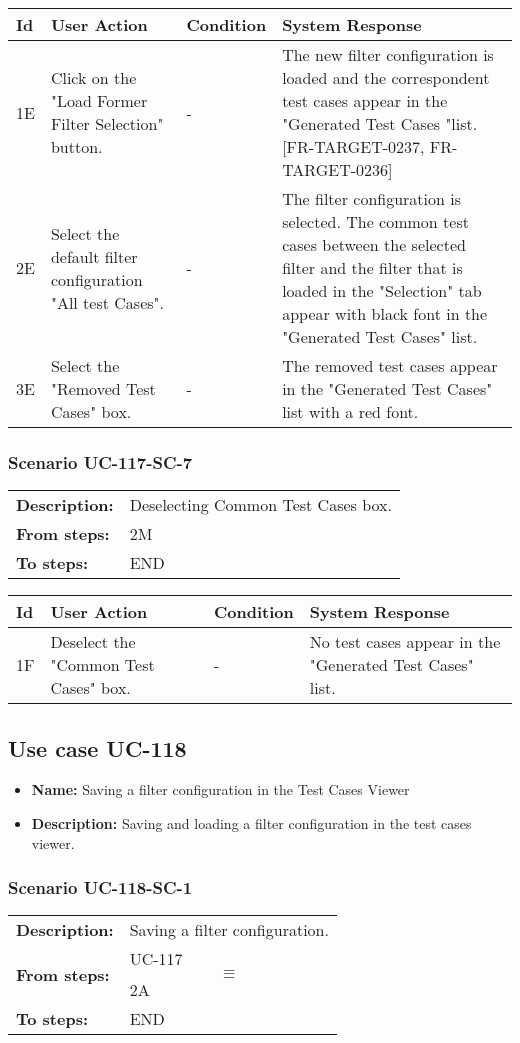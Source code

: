 \documentclass[a4paper,11pt]{article}
\newcommand{\bl}{\\ \hline}
\begin{document}
\begin{tabular}{|p{0.8in}|p{1.6in}|p{1.6in}|p{1.6in}|}
\hline
Id & User Action & Condition & System Response  \bl 
1E & Click on the "Load Former Filter Selection" button. & - & The new filter configuration is loaded and the correspondent test cases appear in the "Generated Test Cases "list. [FR-TARGET-0237, FR-TARGET-0236] \bl 
2E & Select the default filter configuration "All test Cases". & - & The filter configuration is selected. The common test cases between the selected filter and the filter that is loaded in the "Selection" tab appear with black font in the "Generated Test Cases" list. \bl 
3E & Select the "Removed Test Cases" box. & - & The removed test cases appear in the "Generated Test Cases" list with a red font. \bl 
\end{tabular}
\subsubsection*{Scenario UC-117-SC-7}
\begin{tabular}{p{1in}p{4in}}
{\bf Description:} & Deselecting Common Test Cases box. \\
{\bf From steps:} & 2M \\
{\bf To steps:} & END \\
\end{tabular}
 
\begin{tabular}{|p{0.8in}|p{1.6in}|p{1.6in}|p{1.6in}|}
\hline
Id & User Action & Condition & System Response  \bl 
1F & Deselect the "Common Test Cases" box. & - & No test cases appear in the "Generated Test Cases" list. \bl 
\end{tabular}
\subsection*{Use case UC-118}
\begin{itemize}
\item {\bf Name: }Saving a filter configuration in the Test Cases Viewer
\item {\bf Description: }Saving and loading a filter configuration in the test cases viewer.
\end{itemize}
\subsubsection*{Scenario UC-118-SC-1}
\begin{tabular}{p{1in}p{4in}}
{\bf Description:} & Saving a filter configuration. \\
{\bf From steps:} & UC-117$$\equiv$$2A \\
{\bf To steps:} & END \\
\end{tabular}
 
\end{document}

